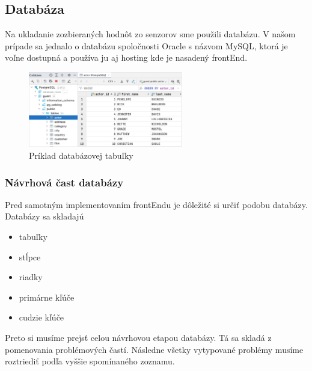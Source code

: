 \subsection{Databáza}
Na ukladanie zozbieraných hodnôt zo senzorov sme použili databázu. V našom prípade sa jednalo o databázu spoločnosti Oracle s názvom MySQL, ktorá je voľne dostupná a používa ju aj hosting kde je nasadený frontEnd.
\begin{figure}[h!]
    \centering
    \includegraphics[width=0.6\textwidth]{obrazky/Table.png}
    \caption{Príklad databázovej tabuľky}
\end{figure}

\subsubsection{Návrhová čast databázy}
Pred samotným implementovaním frontEndu je dôležité si určiť podobu databázy. Databázy sa skladajú
\begin{itemize}
    \item tabuľky   
     \item stĺpce
     \item riadky
     \item primárne kľúče
     \item cudzie kľúče
\end{itemize} 
Preto si musíme prejsť celou návrhovou etapou databázy. Tá sa skladá z pomenovania problémových častí. Následne všetky vytypované problémy musíme roztriediť podľa vyššie spomínaného zoznamu.